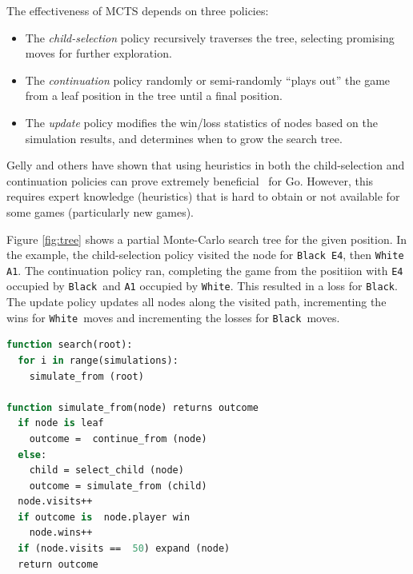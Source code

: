 \documentclass{acm_proc_article-sp}
\newcommand{\hblack}{\texttt{Black}}
\newcommand{\hwhite}{\texttt{White}}
\begin{document}
The effectiveness of MCTS depends on three policies:
\begin{itemize}
\item{The \emph{child-selection} policy recursively traverses the tree, selecting promising moves for further exploration.}
\item{The \emph{continuation} policy randomly or semi-randomly ``plays out'' the game from a leaf position in the tree until a final position.}
\item{The \emph{update} policy modifies the win/loss statistics of nodes based on the simulation results, and determines when to grow the search tree.}
\end{itemize}

Gelly and others have shown that using heuristics in both the child-selection and continuation policies 
can prove extremely beneficial~\cite{gelly2006modification,gelly2008achieving} for Go.
However, this requires expert knowledge (heuristics) that is hard to obtain or not available for some games (particularly new games). 

Figure \ref{fig:tree} shows a partial Monte-Carlo search tree for the given position. In the example, the child-selection policy visited the node for \texttt{Black E4}, then \texttt{White A1}. 
The continuation policy ran, completing the game from the positiion with \texttt{E4} occupied by \hblack\ and \texttt{A1} occupied by \hwhite.
This resulted in a loss for \hblack. 
The update policy updates all nodes along the visited path, incrementing the wins for \hwhite\ moves and incrementing the losses for \hblack\ moves.

\begin{lstlisting}[float,frame=single,language=Pascal,caption=MCTS Algorithm Pseudocode]
function search(root):
  for i in range(simulations):
    simulate_from (root)

function simulate_from(node) returns outcome
  if node is leaf
    outcome =  continue_from (node)
  else:
    child = select_child (node)
    outcome = simulate_from (child)
  node.visits++
  if outcome is  node.player win
    node.wins++
  if (node.visits ==  50) expand (node)
  return outcome
\end{lstlisting}
\end{document}
